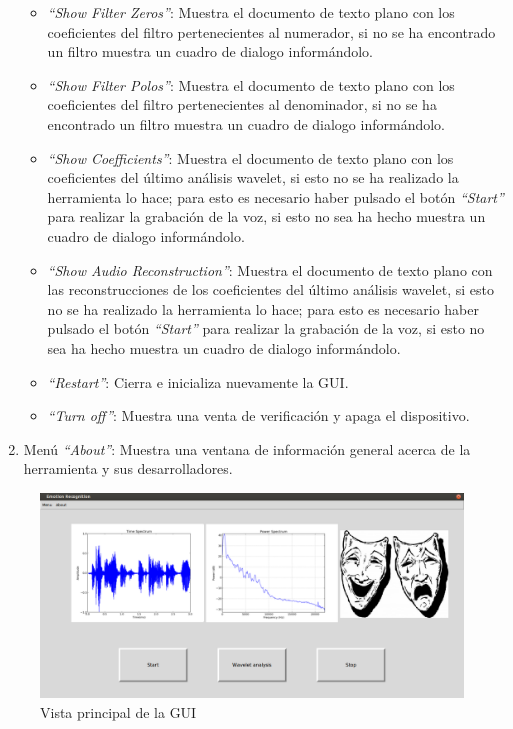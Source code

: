 \documentclass[11pt,lettersize]{article} %
\begin{document}
\begin{enumerate}
\begin{itemize}
		\item \textit{``Show Filter Zeros''}: Muestra el documento de texto plano con los coeficientes del filtro pertenecientes al numerador, si no se ha encontrado un filtro muestra un cuadro de dialogo informándolo.
		\item \textit{``Show Filter Polos''}: Muestra el documento de texto plano con los coeficientes del filtro pertenecientes al denominador, si no se ha encontrado un filtro muestra un cuadro de dialogo informándolo.
		\item \textit{``Show Coefficients''}: Muestra el documento de texto plano con los coeficientes del último análisis wavelet, si esto no se ha realizado la herramienta lo hace; para esto es necesario haber pulsado el botón \textit{``Start''} para realizar la grabación de la voz, si esto no sea ha hecho muestra un cuadro de dialogo informándolo.
		\item \textit{``Show Audio Reconstruction''}: Muestra el documento de texto plano con las reconstrucciones de los coeficientes del último análisis wavelet, si esto no se ha realizado la herramienta lo hace; para esto es necesario haber pulsado el botón \textit{``Start''} para realizar la grabación de la voz, si esto no sea ha hecho muestra un cuadro de dialogo informándolo.
		\item \textit{``Restart''}: Cierra e inicializa nuevamente la GUI.
		\item \textit{``Turn off''}: Muestra una venta de verificación y apaga el dispositivo.
	\end{itemize}
	\item Menú \textit{``About''}: Muestra una ventana de información general acerca de la herramienta y sus desarrolladores.
\end{enumerate}

\begin{figure}[h!]
	\centering
	\includegraphics[width=1\textwidth]{images/gui-principal.png}
	\caption{Vista principal de la GUI}
	\label{F-gui-principal}
\end{figure}
\end{document}
